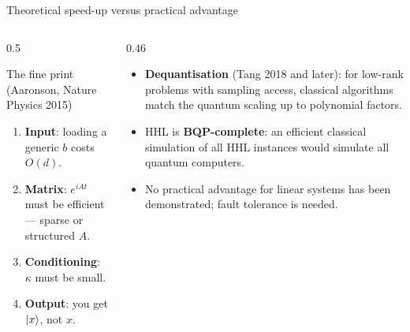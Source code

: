 \documentclass[aspectratio=169,11pt]{beamer}
\newcommand{\key}[1]{{\color{qdark}\textbf{#1}}}
\begin{document}
\begin{frame}{Theoretical speed-up versus practical advantage}
  \begin{columns}[T]
    \begin{column}{0.5\textwidth}
      \begin{alertblock}{The fine print (Aaronson, Nature Physics 2015)}
        \small
        \begin{enumerate}
          \item \key{Input}: loading a generic $b$ costs $O(d)$.
          \item \key{Matrix}: $e^{iAt}$ must be efficient --- sparse or structured $A$.
          \item \key{Conditioning}: $\kappa$ must be small.
          \item \key{Output}: you get $\ket x$, not $x$.
        \end{enumerate}
      \end{alertblock}
    \end{column}
    \begin{column}{0.46\textwidth}
      \small
      \begin{itemize}
        \item \key{Dequantisation} (Tang 2018 and later): for low-rank problems with sampling access, classical algorithms match the quantum scaling up to polynomial factors.
        \item HHL is \key{BQP-complete}: an efficient classical simulation of all HHL instances would simulate all quantum computers.
        \item No practical advantage for linear systems has been demonstrated; fault tolerance is needed.
      \end{itemize}
    \end{column}
  \end{columns}
\end{frame}

\end{document}
